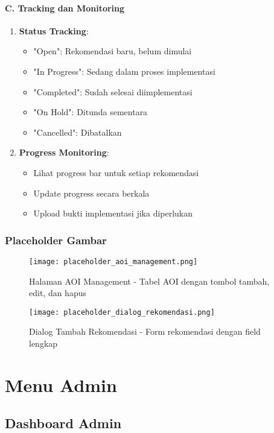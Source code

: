 \documentclass[12pt,a4paper]{article}
\begin{document}
\paragraph{C. Tracking dan Monitoring}
\begin{enumerate}
\item \textbf{Status Tracking}:
\begin{itemize}
\item "Open": Rekomendasi baru, belum dimulai
\item "In Progress": Sedang dalam proses implementasi
\item "Completed": Sudah selesai diimplementasi
\item "On Hold": Ditunda sementara
\item "Cancelled": Dibatalkan
\end{itemize}
\item \textbf{Progress Monitoring}:
\begin{itemize}
\item Lihat progress bar untuk setiap rekomendasi
\item Update progress secara berkala
\item Upload bukti implementasi jika diperlukan
\end{itemize}
\end{enumerate}

\subsubsection{Placeholder Gambar}
\begin{figure}[H]
\centering
\texttt{[image: placeholder\_aoi\_management.png]}
\caption{Halaman AOI Management - Tabel AOI dengan tombol tambah, edit, dan hapus}
\label{fig:aoi_management}
\end{figure}

\begin{figure}[H]
\centering
\texttt{[image: placeholder\_dialog\_rekomendasi.png]}
\caption{Dialog Tambah Rekomendasi - Form rekomendasi dengan field lengkap}
\label{fig:dialog_rekomendasi}
\end{figure}

\section{Menu Admin}

\subsection{Dashboard Admin}
\end{document}

